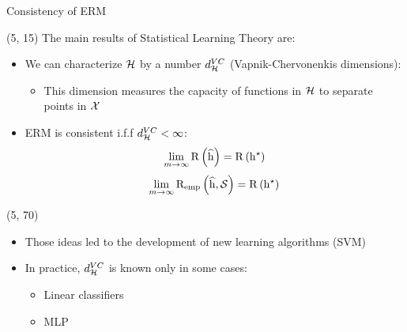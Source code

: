 \begin{frame}{Consistency of \acs{ERM}}

  \begin{textblock}{90}(5, 15)
    The main results of Statistical Learning Theory are:
    \begin{itemize}
    \item<1-> We can characterize $\mathcal{H}$ by a number $d^{VC}_{\mathcal{H}}$
      (Vapnik-Chervonenkis dimensions):
      \begin{itemize}
      \item This dimension measures the capacity of functions in $\mathcal{H}$ to
        separate points in $\mathcal{X}$
      \end{itemize}
    \item<2-> \ac{ERM} is consistent i.f.f $d^{VC}_{\mathcal{H}} < \infty$:
      \[
        \lim\limits_{m \to \infty} \mathrm{R} \left ( {\widehat{\mathrm{h}}} \right ) = \mathrm{R} \left ( {\mathrm{h}^{\star}} \right )
      \]
      \[
        \lim\limits_{m \to \infty}
        \mathrm{R_{emp}} \left ( {\widehat{\mathrm{h}}, \mathcal{S}} \right ) = \mathrm{R} \left ( {\mathrm{h}^{\star}} \right )
      \]
    \end{itemize}
  \end{textblock}

  \begin{textblock}{90}(5, 70)
    \begin{itemize}
    \item<3-> Those ideas led to the development of new learning algorithms (SVM)
    \item<4-> In practice, $d^{VC}_{\mathcal{H}}$ is known only in some cases:
      \begin{itemize}
      \item Linear classifiers
      \item \ac{MLP}
      \end{itemize}
    \end{itemize}
  \end{textblock}
\end{frame}


